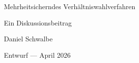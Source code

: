 \documentclass[a4paper, 12pt, numbers=noenddot]{scrartcl}
\begin{document}
\begin{titlepage}
  \centering
  \vspace*{6cm}
  {\LARGE Mehrheitsicherndes Verhältniswahlverfahren\par}
  \vspace{2cm}
  {\normalsize Ein Diskussionsbeitrag\par}
  \vspace{1cm}
  {\normalsize Daniel Schwalbe\par}
  \vspace{1cm}
  {\normalsize Entwurf --- April 2026\par}
  \vfill
\end{titlepage}

\tableofcontents
\newpage


\newpage










\end{document}
